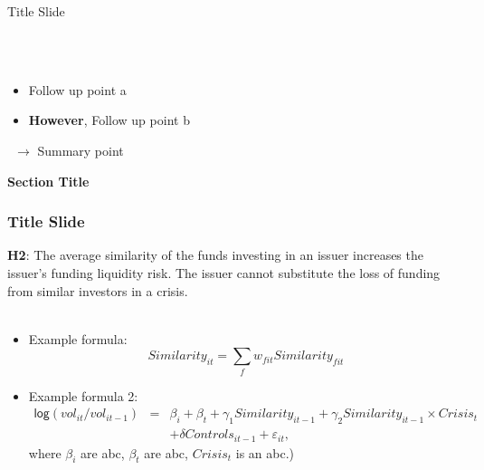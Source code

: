 \documentclass[xcolor=dvipsnames,10pt]{beamer}
\begin{document}
\begin{frame}{Title Slide}
\begin{minipage}{0.475\textwidth}
\begin{figure}[h]
		\end{figure}
	\end{minipage}
	~\\
	~\\
	\begin{itemize}\itemsep10pt
		\item Follow up point a
		\item {\bf However}, Follow up point b
	\end{itemize}
	~\hfill $\rightarrow$ Summary point
\end{frame}


\begin{frame}
	\thispagestyle{empty}
	\begin{center}
		{\bf {\Large Section Title}}
	\end{center}
\end{frame}



\begin{frame}
	\frametitle{Title Slide}
	\setcounter{framenumber}{23}
	{\bf H2}: The average similarity of the funds investing in an issuer increases the issuer’s funding liquidity risk. The issuer cannot substitute the loss of funding from similar investors in a crisis.\\
	~\\
	\begin{itemize}\itemsep15pt
		\item Example formula:
		\[ Similarity_{it}=\sum_{f}w_{fit}Similarity_{fit} \]
		\item Example formula 2:
		\begin{eqnarray*}
			\textsf{log}(vol_{it}/vol_{it-1}) & = & \beta_{i}+\beta_{t}+\gamma_{1}Similarity_{it-1} +\gamma_{2} Similarity_{it-1} \times Crisis_{t}\\
			&  & +\delta Controls_{it-1} + \varepsilon_{it},
		\end{eqnarray*}
		where $\beta_{i}$ are abc, $\beta_{t}$ are abc, $Crisis_{t}$ is an abc.)
	\end{itemize}
\end{frame}

\end{document}
